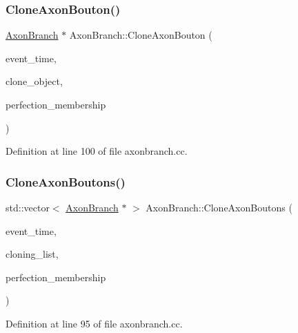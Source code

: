 \subsubsection{\texorpdfstring{Clone\+Axon\+Bouton()}{CloneAxonBouton()}}
{\footnotesize\ttfamily \mbox{\hyperlink{class_axon_branch}{Axon\+Branch}} $\ast$ Axon\+Branch\+::\+Clone\+Axon\+Bouton (\begin{DoxyParamCaption}\item[{std\+::chrono\+::time\+\_\+point$<$ \mbox{\hyperlink{universe_8h_a0ef8d951d1ca5ab3cfaf7ab4c7a6fd80}{Clock}} $>$}]{event\+\_\+time,  }\item[{\mbox{\hyperlink{class_axon_branch}{Axon\+Branch}} $\ast$}]{clone\+\_\+object,  }\item[{double}]{perfection\+\_\+membership }\end{DoxyParamCaption})}



Definition at line 100 of file axonbranch.\+cc.

\mbox{\label{class_axon_branch_a842b3875b2771f4b8e7316bfb9af894c}} 
\subsubsection{\texorpdfstring{Clone\+Axon\+Boutons()}{CloneAxonBoutons()}}
{\footnotesize\ttfamily std\+::vector$<$ \mbox{\hyperlink{class_axon_branch}{Axon\+Branch}} $\ast$ $>$ Axon\+Branch\+::\+Clone\+Axon\+Boutons (\begin{DoxyParamCaption}\item[{std\+::chrono\+::time\+\_\+point$<$ \mbox{\hyperlink{universe_8h_a0ef8d951d1ca5ab3cfaf7ab4c7a6fd80}{Clock}} $>$}]{event\+\_\+time,  }\item[{std\+::vector$<$ \mbox{\hyperlink{class_axon_branch}{Axon\+Branch}} $\ast$$>$}]{cloning\+\_\+list,  }\item[{double}]{perfection\+\_\+membership }\end{DoxyParamCaption})}



Definition at line 95 of file axonbranch.\+cc.

\mbox{\label{class_axon_branch_a30b4602e5dd121666478ff9de52d022b}} 
